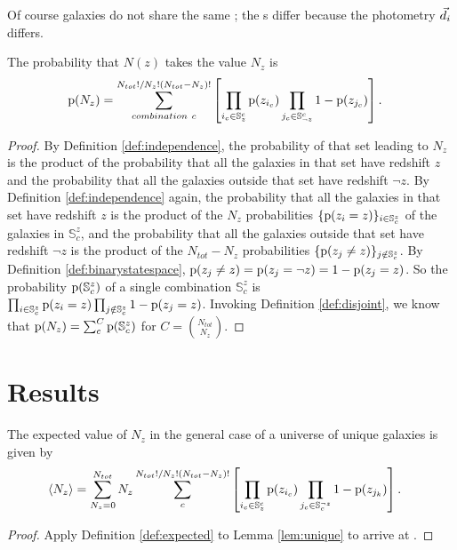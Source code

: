 Of course galaxies do not share the same \pzpdf; the \pzpdf s differ because the photometry $\vec{d}_{i}$ differs.
\begin{lemma}\label{lem:unique}
	The probability that $N(z)$ takes the value $N_{z}$ is 
	\begin{align}
	\eqlabel{eqn:general}
	\pr{N_{z}} &= \sum_{combination\ c}^{N_{tot}! / N_{z}! (N_{tot} - N_{z})!} \left[ \prod_{i_{c} \in \mathbb{S}_{z}^{c}} \pr{z_{i_{c}}} \prod_{j_{c} \in \mathbb{S}_{\lnot z}^{c}} 1 - \pr{z_{j_{c}}} \right] .
	\end{align}
\end{lemma}
\begin{proof}
	By Definition \ref{def:independence}, the probability of that set leading to $N_{z}$ is the product of the probability that all the galaxies in that set have redshift $z$ and the probability that all the galaxies outside that set have redshift $\lnot z$.
	By Definition \ref{def:independence} again, the probability that all the galaxies in that set have redshift $z$ is the product of the $N_{z}$ probabilities $\{\mathrm{p}(z_{i} = z)\}_{i \in \mathbb{S}^{z}_{c}}$ of the galaxies in $\mathbb{S}^{z}_{c}$, and the probability that all the galaxies outside that set have redshift $\lnot z$ is the product of the $N_{tot} - N_{z}$ probabilities $\{\mathrm{p}(z_{j} \neq z)\}_{j \notin \mathbb{S}^{z}_{c}}$.
	By Definition \ref{def:binarystatespace}, $\mathrm{p}(z_{j} \neq z) = \mathrm{p}(z_{j} = \lnot z) = 1 - \mathrm{p}(z_{j} = z)$.
	So the probability $\mathrm{p}(\mathbb{S}^{z}_{c})$ of a single combination $\mathbb{S}^{z}_{c}$ is $\prod_{i \in \mathbb{S}^{z}_{c}} \mathrm{p}(z_{i} = z) \prod_{j \notin \mathbb{S}^{z}_{c}} 1 - \mathrm{p}(z_{j} = z)$.
	Invoking Definition \ref{def:disjoint}, we know that $\mathrm{p}(N_{z}) = \sum_{c}^{C} \mathrm{p}(\mathbb{S}^{z}_{c})$ for $C = \binom{N_{tot}}{N_{z}}$.
\end{proof}

\section{Results}

\begin{theorem}\label{thm:general}
	The expected value of $N_{z}$ in the general case of a universe of unique galaxies is given by
	\begin{align}
	\eqlabel{eqn:complete}
	\langle N_{z} \rangle &= \sum_{N_{z} = 0}^{N_{tot}} N_{z} \sum_{c}^{N_{tot}! / N_{z}! (N_{tot} - N_{z})!} \left[ \prod_{i_{c} \in \mathbb{S}^{c}_{z}} \pr{z_{i_{c}}} \prod_{j_{c} \in \mathbb{S}_{c}^{\lnot z}} 1 - \pr{z_{j_{k}}} \right].
	\end{align}
\end{theorem}
\begin{proof}
	Apply Definition \ref{def:expected} to Lemma \ref{lem:unique} to arrive at .
\end{proof}

